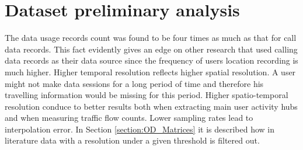 \documentclass[12pt, a4paper]{report}
\theoremstyle{definition}
\theoremstyle{definition}%
\theoremstyle{definition}%
\theoremstyle{definition}%
\theoremstyle{definition}%
\theoremstyle{definition}%
\begin{document}
\begin{table}[h] 
    \centering
\caption{Description of data fields in the mobile usage raw dataset} 
\label{table:dataset_01}
\end{table}


\section{Dataset preliminary analysis} \label{section:methodology:data_set_preliminary_analysis}

The data usage records count was found to be four times as much as that for call data records. This fact evidently gives an edge on other research that used calling data records as their data source since the frequency of users location recording is much higher. Higher temporal resolution reflects higher spatial resolution. A user might not make data sessions for a long period of time and therefore his travelling information would be missing for this period.  Higher spatio-temporal resolution conduce to better results both when extracting main user activity hubs and when measuring traffic flow counts. Lower sampling rates lead to interpolation error. In Section \ref{section:OD_Matrices} it is described how in literature data with a resolution under a given threshold is filtered out.
\end{document}
